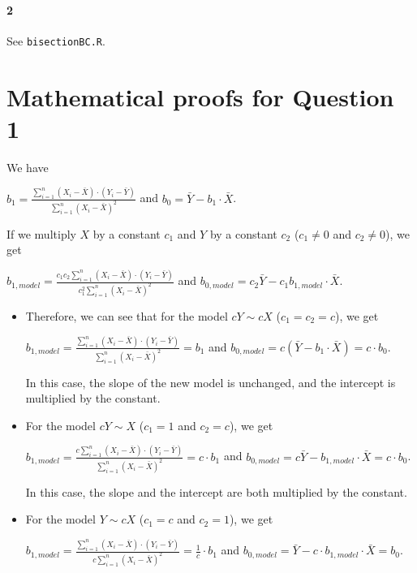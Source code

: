 \documentclass[]{article}
\let\oldparagraph\paragraph
\renewcommand{\paragraph}[1]{\oldparagraph{#1}\mbox{}}
\begin{document}
\paragraph{2}
See \texttt{bisectionBC.R}.



\section*{Mathematical proofs for Question 1}
We have

$b_1 = \frac{\sum_{i=1}^n{(X_i - \bar{X}) \cdot (Y_i - \bar{Y})}}{\sum_{i=1}^n{(X_i - \bar{X})^2}}$ and $b_0 = \bar{Y} - b_1 \cdot \bar{X}$.

If we multiply $X$ by a constant $c_1$ and $Y$ by a constant $c_2$ ($c_1 \neq 0$ and $c_2 \neq 0$), we get

$b_{1, model} = \frac{c_1 c_2 \sum_{i=1}^n{(X_i - \bar{X}) \cdot (Y_i - \bar{Y})}}{c_1^2 \sum_{i=1}^n{(X_i - \bar{X})^2}}$ and $b_{0, model} = c_2 \bar{Y} - c_1 b_{1, model} \cdot \bar{X}$.

\begin{itemize}
\item Therefore, we can see that for the model $cY \sim cX$ ($c_1 = c_2 = c$), we get 

$b_{1, model} = \frac{\sum_{i=1}^n{(X_i - \bar{X}) \cdot (Y_i - \bar{Y})}}{\sum_{i=1}^n{(X_i - \bar{X})^2}} = b_1$ and $b_{0, model} = c (\bar{Y} - b_1 \cdot \bar{X}) = c \cdot b_0$.

In this case, the slope of the new model is unchanged, and the intercept is multiplied by the constant.

\item For the model $cY \sim X$ ($c_1 = 1$ and $c_2 = c$), we get

$b_{1, model} = \frac{c \sum_{i=1}^n{(X_i - \bar{X}) \cdot (Y_i - \bar{Y})}}{\sum_{i=1}^n{(X_i - \bar{X})^2}} = c \cdot b_1$ and $b_{0, model} = c \bar{Y} - b_{1, model} \cdot \bar{X} = c \cdot b_0$.

In this case, the slope and the intercept are both multiplied by the constant.

\item For the model $Y \sim cX$ ($c_1 = c$ and $c_2 = 1$), we get

$b_{1, model} = \frac{\sum_{i=1}^n{(X_i - \bar{X}) \cdot (Y_i - \bar{Y})}}{c \sum_{i=1}^n{(X_i - \bar{X})^2}} = \frac{1}{c} \cdot b_1$ and $b_{0, model} = \bar{Y} - c \cdot b_{1, model} \cdot \bar{X} = b_0$.

\end{itemize}
\end{document}
